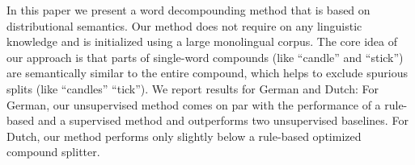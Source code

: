 In this paper we present a word decompounding method that is based on distributional semantics. Our method does not require on any linguistic knowledge and is initialized using a large monolingual corpus. The core idea of our approach is that parts of single-word compounds (like ``candle'' and ``stick'') are semantically similar to the entire compound, which helps to exclude spurious splits (like ``candles'' ``tick''). We report results for German and Dutch: For German, our unsupervised method comes on par with the performance of a rule-based and a supervised method and outperforms two unsupervised baselines. For Dutch, our method performs only slightly below a rule-based optimized compound splitter.
